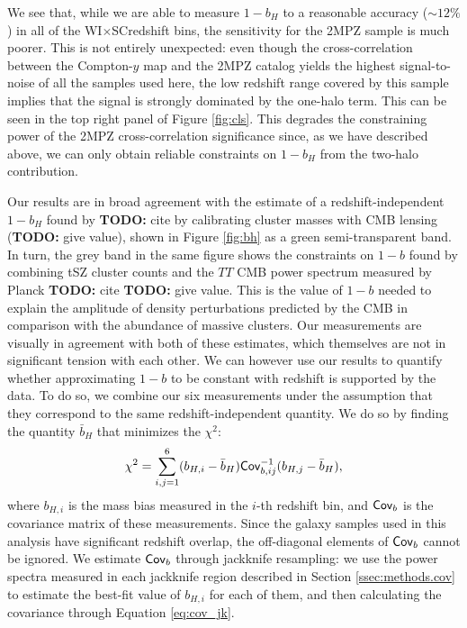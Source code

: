 \documentclass[useAMS,usenatbib]{mn2e}
\newcommand{\wisc}{WI$\times$SC}
\newcommand{\todo}[1]{{\bf TODO:} #1}
\begin{document}
      We see that, while we are able to measure $1-b_H$ to a reasonable accuracy ($\sim12\%$) in all of the \wisc redshift bins, the sensitivity for the 2MPZ sample is much poorer. This is not entirely unexpected: even though the cross-correlation between the Compton-$y$ map and the 2MPZ catalog yields the highest signal-to-noise of all the samples used here, the low redshift range covered by this sample implies that the signal is strongly dominated by the one-halo term. This can be seen in the top right panel of Figure \ref{fig:cls}. This degrades the constraining power of the 2MPZ cross-correlation significance since, as we have described above, we can only obtain reliable constraints on $1-b_H$ from the two-halo contribution.
            
      Our results are in broad agreement with the estimate of a redshift-independent $1-b_H$ found by \todo{cite} by calibrating cluster masses with CMB lensing (\todo{give value}), shown in Figure \ref{fig:bh} as a green semi-transparent band. In turn, the grey band in the same figure shows the constraints on $1-b$ found by combining tSZ cluster counts and the $TT$ CMB power spectrum measured by Planck \todo{cite} \todo{give value}. This is the value of $1-b$ needed to explain the amplitude of density perturbations predicted by the CMB in comparison with the abundance of massive clusters. Our measurements are visually in agreement with both of these estimates, which themselves are not in significant tension with each other. We can however use our results to quantify whether approximating $1-b$ to be constant with redshift is supported by the data. To do so, we combine our six measurements under the assumption that they correspond to the same redshift-independent quantity. We do so by finding the quantity $\bar{b}_H$ that minimizes the $\chi^2$:
      \begin{equation}
        \chi^2=\sum_{i,j=1}^6 (b_{H,i}-\bar{b}_H){\sf Cov}^{-1}_{b,ij}(b_{H,j}-\bar{b}_H),
      \end{equation}
      where $b_{H,i}$ is the mass bias measured in the $i$-th redshift bin, and ${\sf Cov}_b$ is the covariance matrix of these measurements. Since the galaxy samples used in this analysis have significant redshift overlap, the off-diagonal elements of ${\sf Cov}_b$ cannot be ignored. We estimate ${\sf Cov}_b$ through jackknife resampling: we use the power spectra measured in each jackknife region described in Section \ref{ssec:methods.cov} to estimate the best-fit value of $b_{H,i}$ for each of them, and then calculating the covariance through Equation \ref{eq:cov_jk}.
\end{document}
